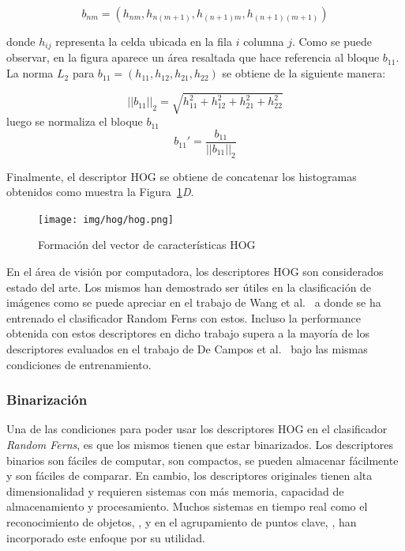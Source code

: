 	$$b_{nm} = (h_{nm}, h_{n(m+1)}, h_{(n+1)m}, h_{(n+1)(m+1)})$$
	
	donde $h_{ij}$ representa la celda ubicada en la fila $i$ columna $j$. Como se puede observar, en la figura aparece un área resaltada que hace referencia al bloque $b_{11}$. La norma $L_{2}$ para $b_{11} = (h_{11}, h_{12}, h_{21}, h_{22})$ se obtiene de la siguiente manera:
	
	 $$||b_{11}||_2 = \sqrt{h_{11}^{2} + h_{12}^{2} + h_{21}^{2} + h_{22}^{2}}$$
	 luego se normaliza el bloque $b_{11}$ 
     $$b_{11}' = \frac{b_{11}}{||b_{11}||_2} $$
     
	 Finalmente, el descriptor HOG se obtiene de concatenar los histogramas obtenidos como muestra la Figura~\ref{fig: Vector HOG}\textit{D}.
	
	
		\begin{figure}[htbp]
			\centering
			\centerline{ \texttt{[image: img/hog/hog.png]} }
			\caption[Extracción HOG]{Formación del vector de características HOG}
			\label{fig: Vector HOG}
		\end{figure}
		
	En el área de visión por computadora, los descriptores HOG son considerados estado del arte. Los mismos han demostrado ser útiles en la clasificación de imágenes como se puede apreciar en el trabajo de Wang et al.~\cite{wang} a donde se ha entrenado el clasificador Random Ferns con estos. Incluso la performance obtenida con estos descriptores en dicho trabajo supera a la mayoría de los descriptores evaluados en el trabajo de De Campos et al.~\cite{dCBV09} bajo las mismas condiciones de entrenamiento.
	
\subsubsection{Binarización}
\label{subsubsection:binarizacion}

	Una de las condiciones para poder usar los descriptores HOG en el clasificador \textit{Random Ferns}, es que los mismos tienen que estar binarizados. Los descriptores binarios son fáciles de computar, son compactos, se pueden almacenar fácilmente y son fáciles de comparar. En cambio, los descriptores originales tienen alta dimensionalidad y requieren sistemas con más memoria, capacidad de almacenamiento y procesamiento. Muchos sistemas en tiempo real como el reconocimiento de objetos, \cite{SJC08}, y en el agrupamiento de puntos clave, \cite{OFL07}, han incorporado este enfoque por su utilidad.
	
